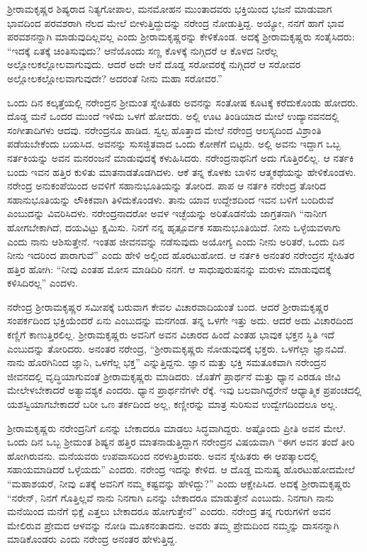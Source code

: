ಶ‍್ರೀರಾಮಕೃಷ್ಣರ ಶಿಷ್ಯರಾದ ನಿತ್ಯಗೋಪಾಲ, ಮನಮೋಹನ ಮುಂತಾದವರು ಭಕ್ತಿಯಿಂದ ಭಜನೆ ಮಾಡುವಾಗ ಭಾವದಿಂದ ಪರವಶರಾಗಿ ನೆಲದ ಮೇಲೆ ಬೀಳುತ್ತಿದ್ದುದನ್ನು ನರೇಂದ್ರ ನೋಡುತ್ತಿದ್ದ. ಅಯ್ಯೋ, ನನಗೆ ಹಾಗೆ ಭಾವ ಪರವಶನನ್ನಾಗಿ ಮಾಡುವುದಿಲ್ಲವಲ್ಲ ಎಂದು ಶ‍್ರೀರಾಮಕೃಷ್ಣರನ್ನು ಕೇಳಿಕೊಂಡ. ಅದಕ್ಕೆ ಶ‍್ರೀರಾಮಕೃಷ್ಣರು ಸಂತೈಸಿದರು: “ಇದಕ್ಕೆ ಏತಕ್ಕೆ ಚಿಂತಿಸುವುದು? ಆನೆಯೊಂದು ಸಣ್ಣ ಕೊಳಕ್ಕೆ ನುಗ್ಗಿದರೆ ಆ ಕೊಳದ ನೀರೆಲ್ಲ ಅಲ್ಲೋಲಕಲ್ಲೋಲವಾಗುವುದು. ಆದರೆ ಅದೇ ಆನೆ ದೊಡ್ಡ ಸರೋವರಕ್ಕೆ ನುಗ್ಗಿದರೆ ಆ ಸರೋವರ ಅಲ್ಲೋಲಕಲ್ಲೋಲವಾಗುವುದೇ? ಅದರಂತೆ ನೀನು ಮಹಾ ಸರೋವರ.”

ಒಂದು ದಿನ ಕಲ್ಕತ್ತೆಯಲ್ಲಿ ನರೇಂದ್ರನ ಶ‍್ರೀಮಂತ ಸ್ನೇಹಿತರು ಅವನನ್ನು ಸಂತೋಷ ಕೂಟಕ್ಕೆ ಕರೆದುಕೊಂಡು ಹೋದರು. ದೊಡ್ಡ ಮನೆ ಒಂದರ ಮುಂದೆ ಇಳಿದು ಒಳಗೆ ಹೋದರು. ಅಲ್ಲಿ ಊಟ ತಿಂಡಿಯಾದ ಮೇಲೆ ಉದ್ಯಾನವನದಲ್ಲಿ ಸಂಗೀತಾದಿಗಳು ಆದವು. ನರೇಂದ್ರನೂ ಹಾಡಿದ. ಸ್ವಲ್ಪ ಹೊತ್ತಾದ ಮೇಲೆ ನರೇಂದ್ರ ಆಲಸ್ಯದಿಂದ ವಿಶ್ರಾಂತಿ ಪಡೆಯಬೇಕೆಂದು ಬಯಸಿದ. ಅವನನ್ನು ಸುಸಜ್ಜಿತವಾದ ಒಂದು ಕೋಣೆಗೆ ಬಿಟ್ಟರು. ಅಲ್ಲಿ ಅವನು ಇದ್ದಾಗ ಒಬ್ಬ ನರ್ತಕಿಯನ್ನು ಅವನ ಮನರಂಜನೆ ಮಾಡುವುದಕ್ಕೆ ಕಳುಹಿಸಿದರು. ನರೇಂದ್ರನಾಥನಿಗೆ ಅದು ಗೊತ್ತಿರಲಿಲ್ಲ. ಆ ನರ್ತಕಿ ಬಂದು ಇವನ ಹತ್ತಿರ ಕುಳಿತು ಮಾತನಾಡತೊಡಗಿದಳು. ಆಕೆ ತನ್ನ ಕೊಳಕು ಬಾಳಿನ ಆತ್ಮಕಥೆಯನ್ನು ಹೇಳಿಕೊಂಡಳು. ನರೇಂದ್ರ ಅನುಕಂಪೆಯಿಂದ ಅವಳಿಗೆ ಸಹಾನುಭೂತಿಯನ್ನು ತೋರಿದ. ಪಾಪ ಆ ನರ್ತಕಿ ನರೇಂದ್ರ ತೋರಿದ ಸಹಾನುಭೂತಿಯನ್ನು ಲೌಕಿಕವಾಗಿ ತಿಳಿದುಕೊಂಡಳು. ತಾನು ಯಾವ ಉದ್ದೇಶದಿಂದ ಇವನ ಬಳಿಗೆ ಬಂದಿರುವೆ ಎಂಬುದನ್ನು ವಿವರಿಸಿದಳು. ನರೇಂದ್ರನಾದರೋ ಅವಳ ಇಚ್ಛೆಯನ್ನು ಅರಿತೊಡನೆಯೆ ಜಾಗ್ರತನಾಗಿ “ನಾನೀಗ ಹೋಗಬೇಕಾಗಿದೆ, ದಯವಿಟ್ಟು ಕ್ಷಮಿಸು. ನಿನಗೆ ನನ್ನ ಹೃತ್ಪೂರ್ವಕ ಸಹಾನುಭೂತಿಯಿದೆ. ನೀನು ಒಳ್ಳೆಯವಳಾಗು ಎಂದು ನಾನು ಆಶಿಸುತ್ತೇನೆ. ಇಂತಹ ಜೀವನವನ್ನು ನಡೆಸುವುದು ಅಯೋಗ್ಯ ಎಂದು ನೀನು ಅರಿತರೆ, ಒಂದು ದಿನ ನೀನು ಇದರಿಂದ ಪಾರಾಗುವೆ” ಎಂದು ಹೇಳಿ ಅಲ್ಲಿಂದ ಹೊರಟುಹೋದ. ಆ ನರ್ತಕಿ ಅನಂತರ ನರೇಂದ್ರನ ಸ್ನೇಹಿತರ ಹತ್ತಿರ ಹೋಗಿ: “ನೀವು ಎಂತಹ ಮೋಸ ಮಾಡಿದಿರಿ ನನಗೆ. ಆ ಸಾಧುಪುರುಷನನ್ನು ಮರುಳು ಮಾಡುವುದಕ್ಕೆ ಕಳಿಸಿದಿರಲ್ಲ” ಎಂದಳು.

ನರೇಂದ್ರ ಶ‍್ರೀರಾಮಕೃಷ್ಣರ ಸಮೀಪಕ್ಕೆ ಬರುವಾಗ ಕೇವಲ ವಿಚಾರವಾದಿಯಂತೆ ಬಂದ. ಆದರೆ ಶ‍್ರೀರಾಮಕೃಷ್ಣರ ಸಂಪರ್ಕದಿಂದ ಭಕ್ತಿಯೆಂದರೆ ಏನು ಎಂಬುದನ್ನು ಮನಗಂಡ. ತನ್ನ ಒಳಗೇ ಇತ್ತು ಅದು. ಆದರೆ ಅದು ವಿಚಾರದಿಂದ ಕಣ್ಣಿಗೆ ಕಾಣುತ್ತಿರಲಿಲ್ಲ. ಶ‍್ರೀರಾಮಕೃಷ್ಣರು ಅವನಿಗೆ ಅವನ ವಿಚಾರದ ಹಿಂದೆ ಎಂತಹ ಭಾವುಕ ಭಕ್ತನ ಸ್ಥಿತಿ ಇದೆ ಎಂಬುದನ್ನು ತೋರಿದರು. ಅನಂತರ ನರೇಂದ್ರ, “ಶ‍್ರೀರಾಮಕೃಷ್ಣರು ನೋಡುವುದಕ್ಕೆ ಭಕ್ತರು. ಒಳಗೆಲ್ಲಾ ಜ್ಞಾನವಿದೆ. ನಾನು ಹೊರಗಿನಿಂದ ಜ್ಞಾನಿ, ಒಳಗೆಲ್ಲ ಭಕ್ತ” ಎನ್ನುತ್ತಿದ್ದನು. ಜ್ಞಾನ ಮತ್ತು ಭಕ್ತಿ ಸಮತೂಕವಾಗಿ ನರೇಂದ್ರನ ಜೀವನದಲ್ಲಿ ವೃದ್ಧಿಯಾಗುವಂತೆ ಶ‍್ರೀರಾಮಕೃಷ್ಣರು ಮಾಡಿದರು. ಜೊತೆಗೆ ಪ್ರಾರ್ಥನೆ ಮತ್ತು ಧ್ಯಾನ ಎರಡೂ ಜೀವಿ ಮೇಲೇಳಬೇಕಾದರೆ ಅತ್ಯಾವಶ್ಯಕ ಎಂದರು. ಧ್ಯಾನ ಪ್ರಾರ್ಥನೆಗಳೇ ರೆಕ್ಕೆ. ಇವು ಬಲವಾಗಿದ್ದರೇನೆ ಆಧ್ಯಾತ್ಮಿಕ ಪ್ರಪಂಚದಲ್ಲಿ ಯಶಸ್ವಿಯಾಗಬೇಕಾದರೆ ಬರೀ ಒಣ ತರ್ಕದಿಂದ ಅಲ್ಲ, ಕಣ್ಣೀರನ್ನು ಮಾತ್ರ ಸುರಿಸುವ ಉದ್ವೇಗದಿಂದಲೂ ಅಲ್ಲ.

ಶ‍್ರೀರಾಮಕೃಷ್ಣರು ನರೇಂದ್ರನಿಗೆ ಏನನ್ನು ಬೇಕಾದರೂ ಮಾಡಲು ಸಿದ್ಧವಾಗಿದ್ದರು. ಅಷ್ಟೊಂದು ಪ್ರೀತಿ ಅವನ ಮೇಲೆ. ಒಂದು ದಿನ ಒಬ್ಬ ಶ‍್ರೀಮಂತ ಶಿಷ್ಯನ ಹತ್ತಿರ ಮಾತನಾಡುತ್ತಿದ್ದಾಗ ನರೇಂದ್ರನ ವಿಷಯವಾಗಿ “ಈಗ ಅವನ ತಂದೆ ತೀರಿ ಹೋಗಿರುವನು. ಮನೆಯವರು ಉಪವಾಸದಿಂದ ನರಳುತ್ತಿರುವರು. ಅವನ ಸ್ನೇಹಿತರು ಈ ಆಪತ್ಕಾಲದಲ್ಲಿ ಸಹಾಯಮಾಡಿದರೆ ಒಳ್ಳೆಯದು” ಎಂದರು. ನರೇಂದ್ರ ಇದನ್ನು ಕೇಳಿದ. ಆ ದೊಡ್ಡ ಮನುಷ್ಯ ಹೊರಟುಹೋದಮೇಲೆ “ಮಹಾಶಯರೆ, ನೀವು ಏತಕ್ಕೆ ಅವನಿಗೆ ನಮ್ಮ ಕಷ್ಟವನ್ನು ಹೇಳಿದ್ದು?” ಎಂದು ಆಕ್ಷೇಪಿಸಿದ. ಅದಕ್ಕೆ ಶ‍್ರೀರಾಮಕೃಷ್ಣರು “ನರೇನ್, ನಿನಗೆ ಗೊತ್ತಿಲ್ಲವೆ ನಾನು ನಿನಗಾಗಿ ಏನನ್ನು ಬೇಕಾದರೂ ಮಾಡುತ್ತೇನೆ ಎಂಬುದು. ನಿನಗಾಗಿ ನಾನು ಮನೆಯಿಂದ ಮನೆಗೆ ಭಿಕ್ಷೆ ಎತ್ತಲು ಬೇಕಾದರೂ ಹೋಗುತ್ತೇನೆ” ಎಂದರು. ನರೇಂದ್ರ ತನ್ನ ಗುರುಗಳಿಗೆ ಅವನ ಮೇಲಿರುವ ಪ್ರೇಮದ ಆಳವನ್ನು ನೋಡಿ ಮೂಕನಂತಾದನು. ಅವರು ತಮ್ಮ ಪ್ರೇಮದಿಂದ ನಮ್ಮನ್ನು ದಾಸನನ್ನಾಗಿ ಮಾಡಿಕೊಂಡರು ಎಂದು ನರೇಂದ್ರ ಅನಂತರ ಹೇಳುತ್ತಿದ್ದ.

